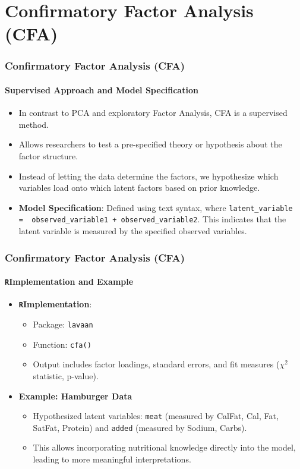 \documentclass{beamer}
\newcommand{\R}{\texttt{R}}
\newcommand{\code}[1]{\texttt{#1}}
\begin{document}
\section{Confirmatory Factor Analysis (CFA)}

\begin{frame}
    \frametitle{Confirmatory Factor Analysis (CFA)}
    \framesubtitle{Supervised Approach and Model Specification}
    \begin{itemize}
        \item In contrast to PCA and exploratory Factor Analysis, CFA is a \alert{supervised} method.
        \item Allows researchers to \alert{test a pre-specified theory} or hypothesis about the factor structure.
        \item Instead of letting the data determine the factors, we hypothesize which variables load onto which latent factors based on prior knowledge.
    \item \textbf{Model Specification}: Defined using text syntax, where \texttt{latent\_variable =~ observed\_variable1 + observed\_variable2}. This indicates that the latent variable is measured by the specified observed variables.
    \end{itemize}
\end{frame}

\begin{frame}
    \frametitle{Confirmatory Factor Analysis (CFA)}
    \framesubtitle{\R Implementation and Example}
    \begin{itemize}
        \item \textbf{\R Implementation}:
            \begin{itemize}
                \item Package: \code{lavaan}
                \item Function: \code{cfa()}
                \item Output includes factor loadings, standard errors, and fit measures ($\chi^2$ statistic, p-value).
            \end{itemize}
        \item \textbf{Example: Hamburger Data}
            \begin{itemize}
                \item Hypothesized latent variables: \code{meat} (measured by CalFat, Cal, Fat, SatFat, Protein) and \code{added} (measured by Sodium, Carbs).
                \item This allows incorporating nutritional knowledge directly into the model, leading to more meaningful interpretations.
            \end{itemize}
    \end{itemize}
\end{frame}
\end{document}

